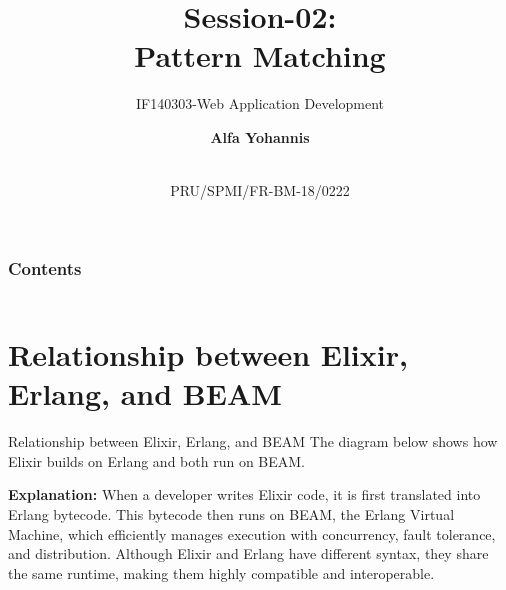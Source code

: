 \documentclass[aspectratio=169, table]{beamer}
\subtitle{IF140303-Web Application Development}
\title{Session-02:\\
\vspace{10pt}
\Huge{Pattern Matching}
}
\date[Serial]{\\\vspace{15pt}\scriptsize {PRU/SPMI/FR-BM-18/0222}}
\author[Pradita]{\small{\textbf{Alfa Yohannis}}}
\begin{document}
	
	\frame{\titlepage}
	
		\begin{frame}[fragile]
		\frametitle{Contents}
		\vspace{20pt}
		\begin{columns}[t]
			\tableofcontents[sections={1-5}]
			
			\tableofcontents[sections={6-20}]
		\end{columns}
	\end{frame}

\section{Relationship between Elixir, Erlang, and BEAM}

\begin{frame}{Relationship between Elixir, Erlang, and BEAM}
\vspace{20pt}
The diagram below shows how Elixir builds on Erlang and both run on BEAM.

\begin{center}
\end{center}

\textbf{Explanation:}  
When a developer writes Elixir code, it is first translated into Erlang bytecode.  
This bytecode then runs on BEAM, the Erlang Virtual Machine, which efficiently  
manages execution with concurrency, fault tolerance, and distribution.  
Although Elixir and Erlang have different syntax, they share the same runtime,  
making them highly compatible and interoperable.
\end{frame}
\end{document}
